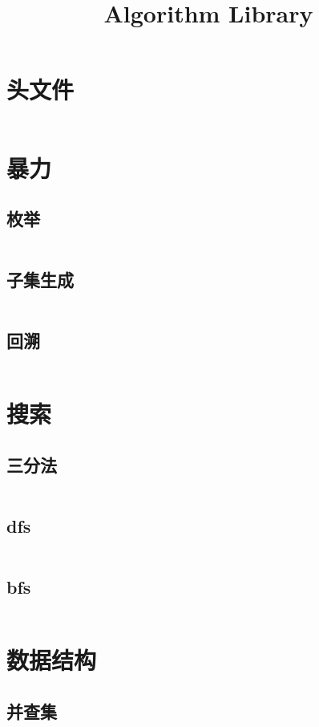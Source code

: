 \documentclass[a4paper,11pt]{article}
\author{}
\title{Algorithm Library}
\begin{document}
 
\maketitle %
\newpage %
\tableofcontents %
\newpage

\section{头文件}
\inputminted[breaklines]{c++}{pre/pre.cpp}

\section{暴力}
\subsection{枚举}
\inputminted[breaklines]{c++}{violence/permutation.cpp}
\subsection{子集生成}
\inputminted[breaklines]{c++}{violence/subset.cpp}
\subsection{回溯}
\inputminted[breaklines]{c++}{violence/backtracking.cpp}


\section{搜索}
\subsection{三分法}
\inputminted[breaklines]{c++}{search/ternarySearch.cpp}
\subsection{dfs}
\inputminted[breaklines]{c++}{search/dfs.cpp}
\subsection{bfs}
\inputminted[breaklines]{c++}{search/bfs.cpp}


\section{数据结构}
\subsection{并查集}
\inputminted[breaklines]{c++}{ds/unionfind.h}
\end{document}
